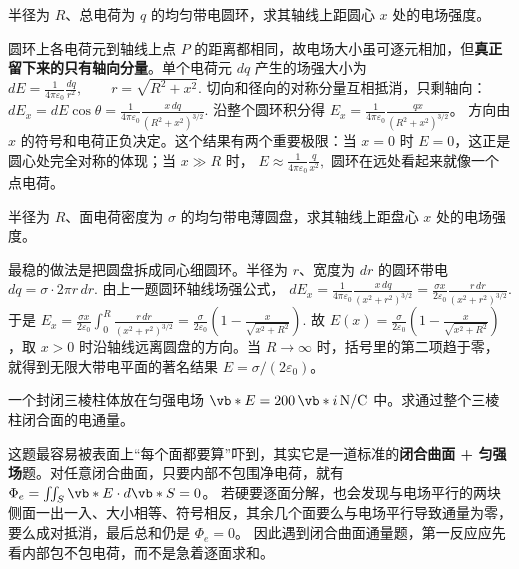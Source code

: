 \documentclass[lang=cn,11pt]{elegantbook}
\begin{document}
\begin{exercise}[均匀带电圆环轴线上的场强]
半径为 \(R\)、总电荷为 \(q\) 的均匀带电圆环，求其轴线上距圆心 \(x\) 处的电场强度。
\end{exercise}

\begin{solution}
圆环上各电荷元到轴线上点 \(P\) 的距离都相同，故电场大小虽可逐元相加，但\textbf{真正留下来的只有轴向分量}。单个电荷元 \(dq\) 产生的场强大小为
 \(dE=\frac{1}{4\pi\varepsilon_0}\frac{dq}{r^2}, \qquad r=\sqrt{R^2+x^2}.\) 
切向和径向的对称分量互相抵消，只剩轴向：
 \(dE_x=dE\cos\theta =\frac{1}{4\pi\varepsilon_0}\frac{x\,dq}{(R^2+x^2)^{3/2}}.\) 
沿整个圆环积分得 \(E_x=\frac{1}{4\pi\varepsilon_0}\frac{qx}{(R^2+x^2)^{3/2}}\)。
方向由 \(x\) 的符号和电荷正负决定。这个结果有两个重要极限：当 \(x=0\) 时 \(E=0\)，这正是圆心处完全对称的体现；当 \(x\gg R\) 时，
 \(E\approx \frac{1}{4\pi\varepsilon_0}\frac{q}{x^2},\) 
圆环在远处看起来就像一个点电荷。
\end{solution}

\begin{exercise}[均匀带电圆盘轴线上的场强]
半径为 \(R\)、面电荷密度为 \(\sigma\) 的均匀带电薄圆盘，求其轴线上距盘心 \(x\) 处的电场强度。
\end{exercise}

\begin{solution}
最稳的做法是把圆盘拆成同心细圆环。半径为 \(r\)、宽度为 \(dr\) 的圆环带电
 \(dq=\sigma\cdot 2\pi r\,dr.\) 
由上一题圆环轴线场强公式，
 \(dE_x=\frac{1}{4\pi\varepsilon_0} \frac{x\,dq}{(x^2+r^2)^{3/2}} =\frac{\sigma x}{2\varepsilon_0} \frac{r\,dr}{(x^2+r^2)^{3/2}}.\) 
于是
 \(E_x=\frac{\sigma x}{2\varepsilon_0} \int_0^R\frac{r\,dr}{(x^2+r^2)^{3/2}} =\frac{\sigma}{2\varepsilon_0}\left(1-\frac{x}{\sqrt{x^2+R^2}}\right).\) 
故 \(E(x)=\frac{\sigma}{2\varepsilon_0}\left(1-\frac{x}{\sqrt{x^2+R^2}}\right)\)，取 \(x>0\) 时沿轴线远离圆盘的方向。当 \(R\to\infty\) 时，括号里的第二项趋于零，就得到无限大带电平面的著名结果 \(E=\sigma/(2\varepsilon_0)\)。
\end{solution}

\begin{exercise}[匀强电场中三棱柱的电通量]
一个封闭三棱柱体放在匀强电场 \(\vb*{E}=200\,\vb*{i}\,\mathrm{N/C}\) 中。求通过整个三棱柱闭合面的电通量。
\end{exercise}

\begin{solution}
这题最容易被表面上“每个面都要算”吓到，其实它是一道标准的\textbf{闭合曲面 + 匀强场}题。对任意闭合曲面，只要内部不包围净电荷，就有
\(\Phi_e=\iint_S \vb*{E}\cdot d\vb*{S}=0\)。
若硬要逐面分解，也会发现与电场平行的两块侧面一出一入、大小相等、符号相反，其余几个面要么与电场平行导致通量为零，要么成对抵消，最后总和仍是
\(\Phi_e=0\)。
因此遇到闭合曲面通量题，第一反应应先看内部包不包电荷，而不是急着逐面求和。
\end{solution}
\end{document}
